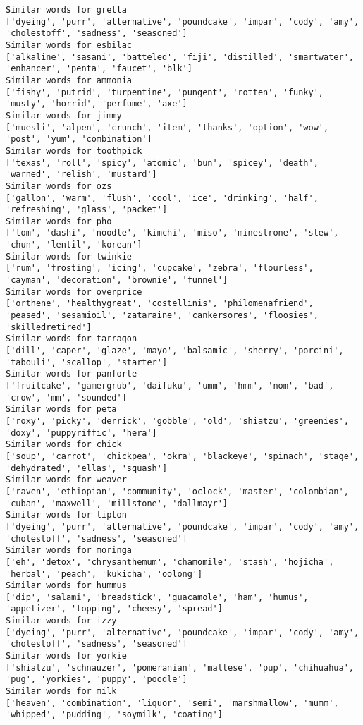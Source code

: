\documentclass[11pt]{article}
\begin{document}
\begin{Verbatim}[commandchars=\\\{\}]
Similar words for gretta
['dyeing', 'purr', 'alternative', 'poundcake', 'impar', 'cody', 'amy', 'cholestoff', 'sadness', 'seasoned']
Similar words for esbilac
['alkaline', 'sasani', 'batteled', 'fiji', 'distilled', 'smartwater', 'enhancer', 'penta', 'faucet', 'blk']
Similar words for ammonia
['fishy', 'putrid', 'turpentine', 'pungent', 'rotten', 'funky', 'musty', 'horrid', 'perfume', 'axe']
Similar words for jimmy
['muesli', 'alpen', 'crunch', 'item', 'thanks', 'option', 'wow', 'post', 'yum', 'combination']
Similar words for toothpick
['texas', 'roll', 'spicy', 'atomic', 'bun', 'spicey', 'death', 'warned', 'relish', 'mustard']
Similar words for ozs
['gallon', 'warm', 'flush', 'cool', 'ice', 'drinking', 'half', 'refreshing', 'glass', 'packet']
Similar words for pho
['tom', 'dashi', 'noodle', 'kimchi', 'miso', 'minestrone', 'stew', 'chun', 'lentil', 'korean']
Similar words for twinkie
['rum', 'frosting', 'icing', 'cupcake', 'zebra', 'flourless', 'cayman', 'decoration', 'brownie', 'funnel']
Similar words for overprice
['orthene', 'healthygreat', 'costellinis', 'philomenafriend', 'peased', 'sesamioil', 'zataraine', 'cankersores', 'floosies', 'skilledretired']
Similar words for tarragon
['dill', 'caper', 'glaze', 'mayo', 'balsamic', 'sherry', 'porcini', 'tabouli', 'scallop', 'starter']
Similar words for panforte
['fruitcake', 'gamergrub', 'daifuku', 'umm', 'hmm', 'nom', 'bad', 'crow', 'mm', 'sounded']
Similar words for peta
['roxy', 'picky', 'derrick', 'gobble', 'old', 'shiatzu', 'greenies', 'doxy', 'puppyriffic', 'hera']
Similar words for chick
['soup', 'carrot', 'chickpea', 'okra', 'blackeye', 'spinach', 'stage', 'dehydrated', 'ellas', 'squash']
Similar words for weaver
['raven', 'ethiopian', 'community', 'oclock', 'master', 'colombian', 'cuban', 'maxwell', 'millstone', 'dallmayr']
Similar words for lipton
['dyeing', 'purr', 'alternative', 'poundcake', 'impar', 'cody', 'amy', 'cholestoff', 'sadness', 'seasoned']
Similar words for moringa
['eh', 'detox', 'chrysanthemum', 'chamomile', 'stash', 'hojicha', 'herbal', 'peach', 'kukicha', 'oolong']
Similar words for hummus
['dip', 'salami', 'breadstick', 'guacamole', 'ham', 'humus', 'appetizer', 'topping', 'cheesy', 'spread']
Similar words for izzy
['dyeing', 'purr', 'alternative', 'poundcake', 'impar', 'cody', 'amy', 'cholestoff', 'sadness', 'seasoned']
Similar words for yorkie
['shiatzu', 'schnauzer', 'pomeranian', 'maltese', 'pup', 'chihuahua', 'pug', 'yorkies', 'puppy', 'poodle']
Similar words for milk
['heaven', 'combination', 'liquor', 'semi', 'marshmallow', 'mumm', 'whipped', 'pudding', 'soymilk', 'coating']

\end{Verbatim}
\end{document}
